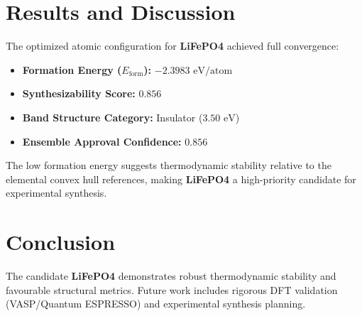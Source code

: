 \documentclass[twocolumn,aps,prb,preprintnumbers,amsmath,amssymb]{revtex4-2}
\begin{document}
\section{Results and Discussion}
The optimized atomic configuration for \textbf{LiFePO4} achieved full convergence:
\begin{itemize}
    \item \textbf{Formation Energy ($E_{\text{form}}$):} $-2.3983\text{ eV/atom}$
    \item \textbf{Synthesizability Score:} $0.856$
    \item \textbf{Band Structure Category:} Insulator ($3.50\text{ eV}$)
    \item \textbf{Ensemble Approval Confidence:} $0.856$
\end{itemize}

The low formation energy suggests thermodynamic stability relative to the elemental convex hull references, making \textbf{LiFePO4} a high-priority candidate for experimental synthesis.

\section{Conclusion}
The candidate \textbf{LiFePO4} demonstrates robust thermodynamic stability and favourable structural metrics. Future work includes rigorous DFT validation (VASP/Quantum ESPRESSO) and experimental synthesis planning.
\end{document}
